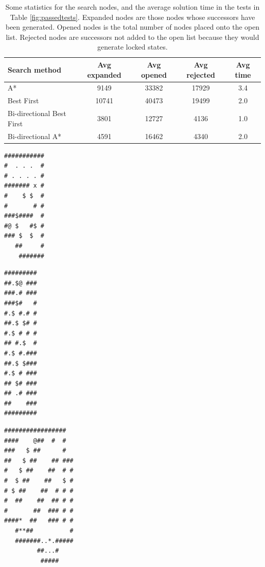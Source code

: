 \documentclass[a4paper,11pt]{article}
\begin{document}
\begin{table}[b]
  \centering
    \begin{tabular}{lcccc}
      Search method              &  Avg expanded  &  Avg opened  &  Avg rejected  &  Avg time  \\
      \hline
      A*                         &          9149  &       33382  &         17929  &           3.4  \\
      Best First                 &         10741  &       40473  &         19499  &           2.0  \\
      Bi-directional Best First  &          3801  &       12727  &          4136  &           1.0  \\
      Bi-directional A*          &          4591  &       16462  &          4340  &           2.0  \\
    \end{tabular}
  \caption{Some statistics for the search nodes, and the average solution time
    in the tests in Table \ref{fig:passedtests}. Expanded nodes are those nodes
    whose successors have been generated. Opened nodes is the total number of
    nodes placed onto the open list. Rejected nodes are successors not added to
    the open list because they would generate locked states.}
  \label{fig:timings}
\end{table}

\begin{lrbox}{\mapff}
  \begin{minipage}{.25\textwidth}
\centering
\begin{BVerbatim}
###########
#  . . .  #
# . . . . #
####### x #
#    $ $  #
#       # #
###$####  #
#@ $   #$ #
### $  $  #
   ##     #
    #######  
\end{BVerbatim}
  \end{minipage}
\end{lrbox}%

\begin{lrbox}{\mapss}
  \begin{minipage}{.25\textwidth}
\centering
\begin{BVerbatim}
#########
##.$@ ###
###.# ###
###$#   #
#.$ #.# #
##.$ $# #
#.$ # # #
## #.$  #
#.$ #.###
##.$ $###
#.$ # ###
## $# ###
## .# ###
##    ###
#########
\end{BVerbatim}
  \end{minipage}
\end{lrbox}%

\begin{lrbox}{\mapnt}
  \begin{minipage}{.25\textwidth}
\centering
\begin{BVerbatim}
#################  
####    @##  #  #  
###   $ ##      #  
##   $ ##    ## ###
#   $ ##    ##  # #
#  $ ##    ##   $ #
# $ ##    ##  # # #
#  ##    ##  ## # #
#       ##  ### # #
####*  ##   ### # #
   #**##          #
   #######..*.#####
         ##...#    
          #####
\end{BVerbatim}
  \end{minipage}
\end{lrbox}%
\end{document}
